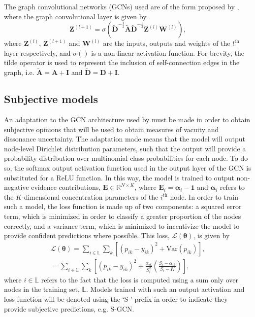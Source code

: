 \documentclass[
twocolumn,
]{ceurart}
\begin{document}
The graph convolutional networks (GCNs) used are of the form proposed by \cite{Kipf2017}, where the graph convolutional layer is given by
\begin{equation}
    \mathbf{Z}^{(l+1)}=\sigma\left(\tilde{\mathbf{D}}^{-\frac{1}{2}}\tilde{\mathbf{A}}\tilde{\mathbf{D}}^{-\frac{1}{2}}\mathbf{Z}^{(l)}\boldsymbol{W}^{(l)}\right),
\label{eq::gcn_layer}
\end{equation}
where $\mathbf{Z}^{(l)}$, $\mathbf{Z}^{(l+1)}$ and $\boldsymbol{W}^{(l)}$ are the inputs, outputs and weights of the $l^\textrm{th}$ layer respectively, and $\sigma()$ is a non-linear activation function.
For brevity, the tilde operator is used to represent the inclusion of self-connection edges in the graph, i.e. $\tilde{\mathbf{A}}=\mathbf{A}+\mathbf{I}$ and $\tilde{\mathbf{D}}=\mathbf{D}+\mathbf{I}$.

\subsection{Subjective models}
An adaptation to the GCN architecture used by \cite{Kipf2017} must be made in order to obtain subjective opinions that will be used to obtain measures of vacuity and dissonance uncertainty.
The adaptation made means that the model will output node-level Dirichlet distribution parameters, such that the output will provide a probability distribution over multinomial class probabilities for each node.
To do so, the softmax output activation function used in the output layer of the GCN is substituted for a ReLU function.
In this way, the model is trained to output non-negative evidence contributions, $\mathbf{E}\in\mathbb{R}^{N\times K}$, where $\mathbf{E}_{i} = \boldsymbol{\alpha}_{i}-\mathbf{1}$ and $\boldsymbol{\alpha}_{i}$ refers to the $K$-dimensional concentration parameters of the $i^\text{th}$ node.
In order to train such a model, the loss function is made up of two components: a squared error term, which is minimized in order to classify a greater proportion of the nodes correctly, and a variance term, which is minimized to incentivize the model to provide confident predictions where possible.
This loss, $\mathcal{L}(\boldsymbol{\theta})$, is given by
\begin{equation}
\begin{split}
    \mathcal{L}(\boldsymbol{\theta})=\sum_{i\in\mathbb{L}}\sum_k \left[(p_{ik}-y_{ik})^2+\text{Var}(p_{ik})\right],\\
    =\sum_{i\in\mathbb{L}}\sum_k \left[(p_{ik}-y_{ik})^2+\frac{\alpha_{ik}}{S_i^2}\left(\frac{S_i-\alpha_{ik}}{S_i-K}\right)\right],
\end{split}
\label{eq:core_loss}
\end{equation}
where $i\in\mathbb{L}$ refers to the fact that the loss is computed using a sum only over nodes in the training set, $\mathbb{L}$.
Models trained with such an output activation and loss function will be denoted using the `S-' prefix in order to indicate they provide subjective predictions, e.g. S-GCN.
\end{document}
